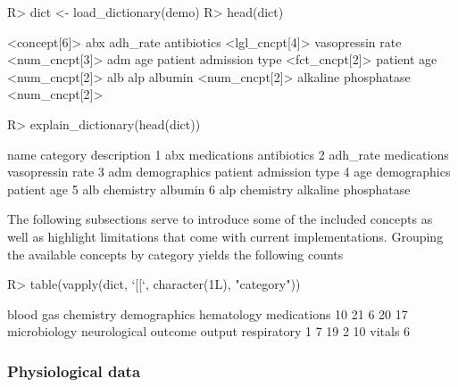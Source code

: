 \documentclass[
  notitle,
  nojss,
  noheadings]{jss}
\begin{document}
\begin{CodeChunk}
\begin{CodeInput}
R> dict <- load_dictionary(demo)
R> head(dict)
\end{CodeInput}
\begin{CodeOutput}
<concept[6]>
                                  abx                              adh_rate 
           antibiotics <lgl_cncpt[4]>       vasopressin rate <num_cncpt[3]> 
                                  adm                                   age 
patient admission type <fct_cncpt[2]>            patient age <num_cncpt[2]> 
                                  alb                                   alp 
               albumin <num_cncpt[2]>   alkaline phosphatase <num_cncpt[2]> 
\end{CodeOutput}
\begin{CodeInput}
R> explain_dictionary(head(dict))
\end{CodeInput}
\begin{CodeOutput}
      name     category            description
1      abx  medications            antibiotics
2 adh_rate  medications       vasopressin rate
3      adm demographics patient admission type
4      age demographics            patient age
5      alb    chemistry                albumin
6      alp    chemistry   alkaline phosphatase
\end{CodeOutput}
\end{CodeChunk}

The following subsections serve to introduce some of the included
concepts as well as highlight limitations that come with current
implementations. Grouping the available concepts by category yields the
following counts

\begin{CodeChunk}
\begin{CodeInput}
R> table(vapply(dict, `[[`, character(1L), "category"))
\end{CodeInput}
\begin{CodeOutput}

   blood gas    chemistry demographics   hematology  medications 
          10           21            6           20           17 
microbiology neurological      outcome       output  respiratory 
           1            7           19            2           10 
      vitals 
           6 
\end{CodeOutput}
\end{CodeChunk}

\hypertarget{physiological-data}{%
\subsubsection{Physiological data}\label{physiological-data}}
\end{document}
